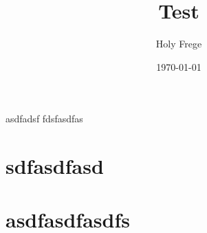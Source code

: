 \documentclass[11pt]{article}
\author{Holy Frege}
\date{\today}
\title{Test}
\begin{document}
\maketitle
\tableofcontents

asdfadsf
fdsfasdfas
\section{sdfasdfasd}
\label{sec:org4d43dea}
\section{asdfasdfasdfs}
\label{sec:org5eb3e77}
\section{}
\label{sec:org0953f19}
\section{}
\label{sec:orgc0ebcb1}
\end{document}
